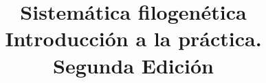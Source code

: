 \usepackage[spanish,activeacute]{babel}

\usepackage[utf8]{inputenc}


\usepackage{enumerate} 
\usepackage{enumitem}



\usepackage[round,authoryear]{natbib}

\usepackage{hyperref}
\usepackage{doi}

\usepackage{url}



\usepackage{framed}



\usepackage{tikz}

%
%





%

\usepackage{verdana}


\usepackage{inconsolata}



\usepackage{parskip}


\usepackage{makeidx}


\makeindex


%
\usepackage[a5paper,right=2.0cm,left=1.5cm,top=2.0cm,bottom=2.0cm,headsep=1.0cm,footskip=1.5cm]{geometry}


\hypersetup{%
%
      pdfcreator=Rafael Miranda-Esquivel,%
      pdfauthor=Rafael Miranda-Esquivel,
      pdfsubject=Introducci\'on' a la Sistem\'atica. 2 Edici\'on (2016),
%
   }




\title{Sistem\'atica filogen\'etica\\Introducci\'on a la pr\'actica.\\{\small{Segunda Edici\'on} }}

